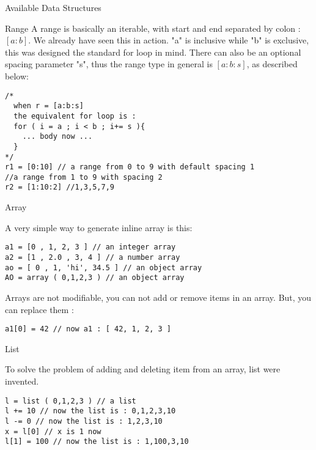 \begin{section}{Available Data Structures}

\begin{subsection}{Range}
A range is basically an iterable, with start and end separated by colon : $[a:b]$.
We already have seen this in action. "a" is inclusive while "b" is exclusive, 
this was designed the standard for loop in mind. There can also be an optional spacing parameter "s",
thus the range type in general is $[a:b:s]$, as described below:

\begin{center}\begin{minipage}{\linewidth}
\begin{lstlisting}[style=JexlStyle]
/* 
  when r = [a:b:s] 
  the equivalent for loop is :
  for ( i = a ; i < b ; i+= s ){
    ... body now ...  
  }
*/
r1 = [0:10] // a range from 0 to 9 with default spacing 1
//a range from 1 to 9 with spacing 2
r2 = [1:10:2] //1,3,5,7,9   
\end{lstlisting}
\end{minipage}\end{center}

\end{subsection}

\begin{subsection}{Array}

A very simple way to generate inline array is this:

\begin{lstlisting}[style=JexlStyle]
a1 = [0 , 1, 2, 3 ] // an integer array 
a2 = [1 , 2.0 , 3, 4 ] // a number array 
ao = [ 0 , 1, 'hi', 34.5 ] // an object array   
AO = array ( 0,1,2,3 ) // an object array  
\end{lstlisting}
Arrays are not modifiable, you can not add or remove items in an array.
But, you can replace them :
\begin{lstlisting}[style=JexlStyle]
a1[0] = 42 // now a1 : [ 42, 1, 2, 3 ]
\end{lstlisting}
\end{subsection}

\begin{subsection}{List}

To solve the problem of adding and deleting item from an array, list were invented.
\begin{lstlisting}[style=JexlStyle]
l = list ( 0,1,2,3 ) // a list  
l += 10 // now the list is : 0,1,2,3,10
l -= 0 // now the list is : 1,2,3,10
x = l[0] // x is 1 now
l[1] = 100 // now the list is : 1,100,3,10 
\end{lstlisting}


\end{subsection}
\end{section}
